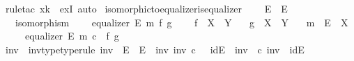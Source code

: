 \begin{isabellebody}
\ {\isacharparenleft}{\kern0pt}rule{\isacharunderscore}{\kern0pt}tac\ x{\isacharequal}{\kern0pt}{\isachardoublequoteopen}k{\isacharprime}{\kern0pt}{\isachardoublequoteclose}\ \ exI{\isacharcomma}{\kern0pt}\ auto{\isacharparenright}{\kern0pt}\isanewline
{}\isamarkupfalse%
%
\endisatagproof
{\isafoldproof}%
%
\isadelimproof
\isanewline
%
\endisadelimproof
\isanewline
{}\isamarkupfalse%
\ isomorphic{\isacharunderscore}{\kern0pt}to{\isacharunderscore}{\kern0pt}equalizer{\isacharunderscore}{\kern0pt}is{\isacharunderscore}{\kern0pt}equalizer{\isacharcolon}{\kern0pt}\isanewline
\ \ \ {\isachardoublequoteopen}{\isasymphi}{\isacharcolon}{\kern0pt}\ E{\isacharprime}{\kern0pt}\ {\isasymrightarrow}\ E{\isachardoublequoteclose}\isanewline
\ \ \ {\isachardoublequoteopen}isomorphism\ {\isasymphi}{\isachardoublequoteclose}\isanewline
\ \ \ {\isachardoublequoteopen}equalizer\ E\ m\ f\ g{\isachardoublequoteclose}\ \isanewline
\ \ \ {\isachardoublequoteopen}f\ {\isacharcolon}{\kern0pt}\ X\ {\isasymrightarrow}\ Y{\isachardoublequoteclose}\isanewline
\ \ \ {\isachardoublequoteopen}g\ {\isacharcolon}{\kern0pt}\ X\ {\isasymrightarrow}\ Y{\isachardoublequoteclose}\isanewline
\ \ \ {\isachardoublequoteopen}m\ {\isacharcolon}{\kern0pt}\ E\ {\isasymrightarrow}\ X{\isachardoublequoteclose}\isanewline
\ \ \ \ \ {\isachardoublequoteopen}equalizer\ E{\isacharprime}{\kern0pt}\ {\isacharparenleft}{\kern0pt}m\ {\isasymcirc}\isactrlsub c\ {\isasymphi}{\isacharparenright}{\kern0pt}\ f\ g{\isachardoublequoteclose}\isanewline
%
\isadelimproof
%
\endisadelimproof
%
\isatagproof
{}\isamarkupfalse%
\ {\isacharminus}{\kern0pt}\ \isanewline
\ \ \isamarkupfalse%
\ {\isasymphi}{\isacharunderscore}{\kern0pt}inv\ \ {\isasymphi}{\isacharunderscore}{\kern0pt}inv{\isacharunderscore}{\kern0pt}type{\isacharbrackleft}{\kern0pt}type{\isacharunderscore}{\kern0pt}rule{\isacharbrackright}{\kern0pt}{\isacharcolon}{\kern0pt}\ {\isachardoublequoteopen}{\isasymphi}{\isacharunderscore}{\kern0pt}inv\ {\isacharcolon}{\kern0pt}\ E\ {\isasymrightarrow}\ E{\isacharprime}{\kern0pt}{\isachardoublequoteclose}\ \ {\isasymphi}{\isacharunderscore}{\kern0pt}inv{\isacharunderscore}{\kern0pt}{\isasymphi}{\isacharcolon}{\kern0pt}\ {\isachardoublequoteopen}{\isasymphi}{\isacharunderscore}{\kern0pt}inv\ {\isasymcirc}\isactrlsub c\ {\isasymphi}\ {\isacharequal}{\kern0pt}\ id{\isacharparenleft}{\kern0pt}E{\isacharprime}{\kern0pt}{\isacharparenright}{\kern0pt}{\isachardoublequoteclose}\ \ {\isasymphi}{\isasymphi}{\isacharunderscore}{\kern0pt}inv{\isacharcolon}{\kern0pt}\ {\isachardoublequoteopen}{\isasymphi}\ {\isasymcirc}\isactrlsub c\ {\isasymphi}{\isacharunderscore}{\kern0pt}inv\ {\isacharequal}{\kern0pt}\ id{\isacharparenleft}{\kern0pt}E{\isacharparenright}{\kern0pt}{\isachardoublequoteclose}\isanewline

\end{isabellebody}
